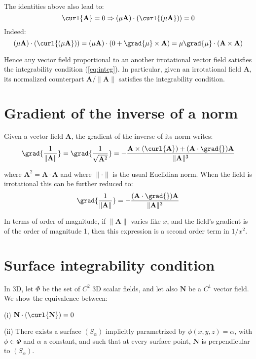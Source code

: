 \paragraph{}
The identities above also lead to:
\[
\curl{\mathbf{A}} = 0 \Rightarrow (\mu \mathbf{A}) \cdot (\curl{(\mu \mathbf{A}})) = 0
\]
Indeed:
\[  (\mu \mathbf{A}) \cdot (\curl{(\mu \mathbf{A}})) =
  (\mu \mathbf{A}) \cdot (0 + \grad{\mu} \times \mathbf{A}) = 
   \mu \grad{\mathbf{\mu}}\cdot(\mathbf{A} \times \mathbf{A})
\]

Hence any vector field proportional to an another irrotational vector field 
satisfies the integrability condition (\ref{eq:integ}). 
In particular, given an irrotational field $\mathbf{A}$, its normalized
counterpart
$ \mathbf{A} / \|\mathbf{A}\| $ satisfies the integrability condition.

\section*{Gradient of the inverse of a norm}
Given a vector field $\mathbf{A}$, the gradient of the inverse of its norm writes:
\[ 
  \grad{\frac{1}{\|\mathbf{A}\|}} = 
  \grad{\frac{1}{\sqrt{\mathbf{A}^2}}} =
  - \frac{\mathbf{A} \times (\curl{\mathbf{A}}) + 
  (\mathbf{A}\cdot\grad{})\mathbf{A}}{\|\mathbf{A}\|^3} 
  \]


 
where $\mathbf{A}^2= \mathbf{A} \cdot \mathbf{A}$ and where $ \| \cdot \| $ is 
the usual Euclidian norm.
When the field is irrotational this can be further reduced to:
\[
  \grad{\frac{1}{\|\mathbf{A}\|}} = 
  - \frac{(\mathbf{A}\cdot\grad{})\mathbf{A}}{\|\mathbf{A}\|^3} 
  \]

In terms of order of magnitude, if $ \|\mathbf{A}\| $ varies like $x$, and 
the field's gradient is of the order of magnitude 1, then
this expression is a second order term in $1/x^2$.

\section*{Surface integrability condition}
In 3D, let $\Phi$ be the set of $C^2$ 3D scalar fields, and let also $\mathbf{N}$ be a 
$C^1$  vector field.
We show the equivalence between:

(i)  $ \mathbf{N} \cdot (\curl{\mathbf{N}}) = 0 $ 

(ii) There exists a surface $(S_\alpha)$ implicitly parametrized
 by $\phi(x,y,z) = \alpha$,
with $\phi \in \Phi$ and $\alpha$ a constant, 
and such that at every surface point, $\mathbf{N}$ 
is perpendicular to $(S_\alpha)$. 


